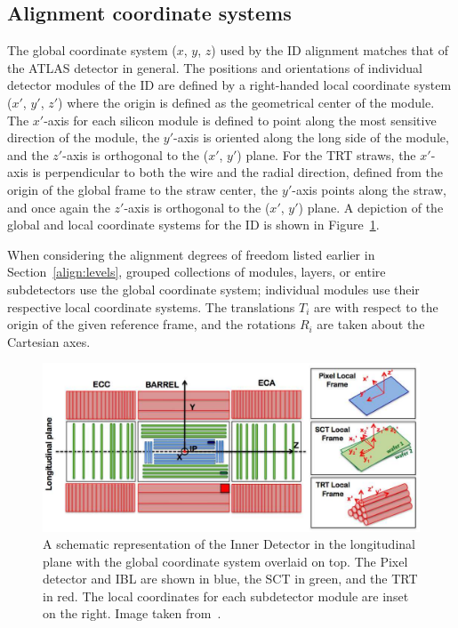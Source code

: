 \subsection{Alignment coordinate systems}\label{align:coords}
The global coordinate system ($x$, $y$, $z$) used by the ID alignment matches that of the ATLAS detector in general.
The positions and orientations of individual detector modules of the ID are defined by a right-handed local coordinate system ($x'$, $y'$, $z'$) where the origin is defined as the geometrical center of the module.
The $x'$-axis for each silicon module is defined to point along the most sensitive direction of the module, the $y'$-axis is oriented along the long side of the module, and the $z'$-axis is orthogonal to the ($x'$, $y'$) plane.
For the TRT straws, the $x'$-axis is perpendicular to both the wire and the radial direction, defined from the origin of the global frame to the straw center, the $y'$-axis points along the straw, and once again the $z'$-axis is orthogonal to the ($x'$, $y'$) plane.
A depiction of the global and local coordinate systems for the ID is shown in Figure~\ref{fig:align_coords}.

When considering the alignment degrees of freedom listed earlier in Section~\ref{align:levels}, grouped collections of modules, layers, or entire subdetectors use the global coordinate system; individual modules use their respective local coordinate systems.
The translations $T_i$ are with respect to the origin of the given reference frame, and the rotations $R_i$ are taken about the Cartesian axes.

\begin{figure}
  \centering
  \includegraphics[width=.8\textwidth]{figs/alignment/ReferenceFrame}
  \caption[A schematic representation of the Inner Detector in the longitudinal plane with the global coordinate system overlaid on top.  The Pixel detector and IBL are shown in blue, the SCT in green, and the TRT in red.  The local coordinates for each subdetector module are inset on the right.]{A schematic representation of the Inner Detector in the longitudinal plane with the global coordinate system overlaid on top.  The Pixel detector and IBL are shown in blue, the SCT in green, and the TRT in red.  The local coordinates for each subdetector module are inset on the right.  Image taken from~\cite{2015.alignment-2015-cosmic}.}
  \label{fig:align_coords}
\end{figure}
